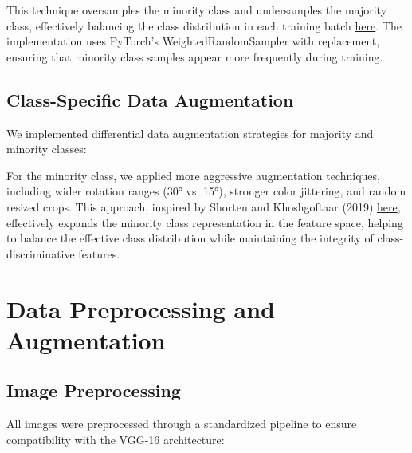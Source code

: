\documentclass[a4paper,12pt]{article}
\begin{document}
This technique oversamples the minority class and undersamples the majority class, effectively balancing the class distribution in each training batch \href{https://www.sciencedirect.com/science/article/pii/S0893608018302107}{here}. The implementation uses PyTorch's WeightedRandomSampler with replacement, ensuring that minority class samples appear more frequently during training.

\subsection{Class-Specific Data Augmentation}
We implemented differential data augmentation strategies for majority and minority classes:


For the minority class, we applied more aggressive augmentation techniques, including wider rotation ranges (30° vs. 15°), stronger color jittering, and random resized crops. This approach, inspired by Shorten and Khoshgoftaar (2019) \href{https://journalofbigdata.springeropen.com/articles/10.1186/s40537-019-0197-0}{here}, effectively expands the minority class representation in the feature space, helping to balance the effective class distribution while maintaining the integrity of class-discriminative features.

\section{Data Preprocessing and Augmentation}

\subsection{Image Preprocessing}
All images were preprocessed through a standardized pipeline to ensure compatibility with the VGG-16 architecture:

\end{document}
